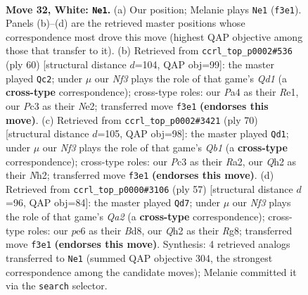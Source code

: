 \documentclass[11pt]{article}
\begin{document}
\clearpage

\begin{figure}[p]\centering
\begin{subfigure}{0.46\textwidth}\centering
\resizebox{\linewidth}{!}{%
\newchessgame
\chessboard[
  setfen={1n3rk1/2pnq2p/rp2p1p1/p3Pp2/P2P1P1P/1RP2NN1/2K3PQ/5R2 w - - 5 32},
  showmover=false,
  pgfstyle=straightmove, color=movearrow, markmove={f3-e1}
]}
\caption{}
\end{subfigure}\hfill
\begin{subfigure}{0.46\textwidth}\centering
\resizebox{\linewidth}{!}{%
\newchessgame
\chessboard[
  setfen={2rr4/4qp1k/pp1ppnpp/2n5/P1P1P3/1PN2PP1/3RN1KP/3QR3 w - - 8 31},
  showmover=false,
  pgfstyle=straightmove, color=movearrow, markmove={d1-c2}
]}
\caption{}
\end{subfigure}
\\[4pt]
\begin{subfigure}{0.46\textwidth}\centering
\resizebox{\linewidth}{!}{%
\newchessgame
\chessboard[
  setfen={4qrk1/R1p2rp1/1p1ppnnp/1P2p3/2P1P2P/3P1NP1/R4P1N/1Q4K1 w - - 1 36},
  showmover=false,
  pgfstyle=straightmove, color=movearrow, markmove={b1-d1}
]}
\caption{}
\end{subfigure}\hfill
\begin{subfigure}{0.46\textwidth}\centering
\resizebox{\linewidth}{!}{%
\newchessgame
\chessboard[
  setfen={3b1kr1/q4n2/rpn1p1p1/2p1Pp1p/2Pp1P2/P2P1N1P/4Q1P1/RRB1N2K b - - 18 29},
  showmover=false,
  pgfstyle=straightmove, color=movearrow, markmove={a7-d7}
]}
\caption{}
\end{subfigure}
\caption{\textbf{Move 32, White: \texttt{Ne1}.} (a) Our position; Melanie plays \texttt{Ne1} (\texttt{f3e1}). Panels (b)--(d) are the retrieved master positions whose correspondence most drove this move (highest QAP objective among those that transfer to it). (b) Retrieved from \texttt{ccrl\_top\_p0002\#536} (ply 60) [structural distance $d$=104, QAP obj=99]: the master played \texttt{Qc2}; under $\mu$ our \emph{Nf3} plays the role of that game's \emph{Qd1} (a \textbf{cross-type} correspondence); cross-type roles: our \emph{P}a4 as their \emph{R}e1, our \emph{P}c3 as their \emph{N}e2; transferred move \texttt{f3e1} \textbf{(endorses this move)}. (c) Retrieved from \texttt{ccrl\_top\_p0002\#3421} (ply 70) [structural distance $d$=105, QAP obj=98]: the master played \texttt{Qd1}; under $\mu$ our \emph{Nf3} plays the role of that game's \emph{Qb1} (a \textbf{cross-type} correspondence); cross-type roles: our \emph{P}c3 as their \emph{R}a2, our \emph{Q}h2 as their \emph{N}h2; transferred move \texttt{f3e1} \textbf{(endorses this move)}. (d) Retrieved from \texttt{ccrl\_top\_p0000\#3106} (ply 57) [structural distance $d$=96, QAP obj=84]: the master played \texttt{Qd7}; under $\mu$ our \emph{Nf3} plays the role of that game's \emph{Qa2} (a \textbf{cross-type} correspondence); cross-type roles: our \emph{p}e6 as their \emph{B}d8, our \emph{Q}h2 as their \emph{R}g8; transferred move \texttt{f3e1} \textbf{(endorses this move)}. Synthesis: 4 retrieved analogs transferred to \texttt{Ne1} (summed QAP objective 304, the strongest correspondence among the candidate moves); Melanie committed it via the \texttt{search} selector.}
\label{fig:thought-m62}
\end{figure}
\end{document}
